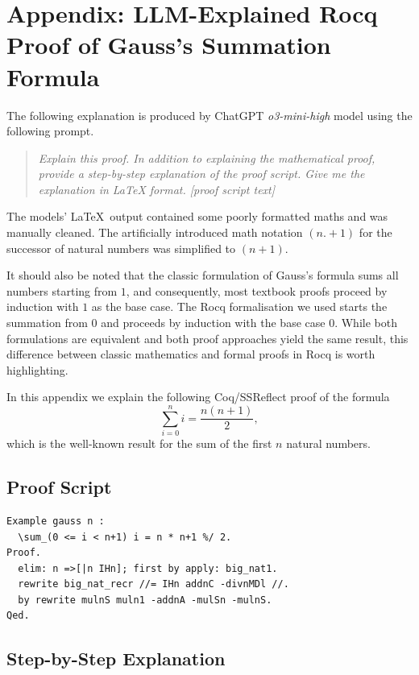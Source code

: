 \documentclass[10pt,nonacm,natbib=false]{acmart}
\begin{document}
\newpage
\section{Appendix: LLM-Explained Rocq Proof of Gauss's Summation Formula}
\label{sec:explained}

The following explanation is produced by ChatGPT \textit{o3-mini-high}
model using the following prompt.

\begin{quotation}
  \textit{Explain this proof. In addition to explaining the
    mathematical proof, provide a step-by-step explanation of the
    proof script. Give me the explanation in LaTeX format. [proof script text]}

\end{quotation}

\noindent The models' \LaTeX\ output contained some poorly formatted
maths and was manually cleaned. The artificially introduced math
notation $(n.+1)$ for the successor of natural numbers was simplified
to $(n+1)$.

It should also be noted that the classic formulation of Gauss's
formula sums all numbers starting from $1$, and consequently, most
textbook proofs proceed by induction with $1$ as the base case. The
Rocq formalisation we used starts the summation from $0$ and proceeds
by induction with the base case $0$. While both formulations are
equivalent and both proof approaches yield the same result, this
difference between classic mathematics and formal proofs in Rocq is
worth highlighting.

\noindent\hdashrule[0.5ex]{\textwidth}{1pt}{1pt}

In this appendix we explain the following Coq/SSReflect proof of the formula
\[
\sum_{i=0}^ {n} i = \frac{n(n+1)}{2},
\]
which is the well-known result for the sum of the first \( n \) natural numbers.

\subsection*{Proof Script}
\begin{lstlisting}
Example gauss n :
  \sum_(0 <= i < n+1) i = n * n+1 %/ 2.
Proof.
  elim: n =>[|n IHn]; first by apply: big_nat1.
  rewrite big_nat_recr //= IHn addnC -divnMDl //.
  by rewrite mulnS muln1 -addnA -mulSn -mulnS.
Qed.
\end{lstlisting}

\subsection*{Step-by-Step Explanation}
\end{document}
